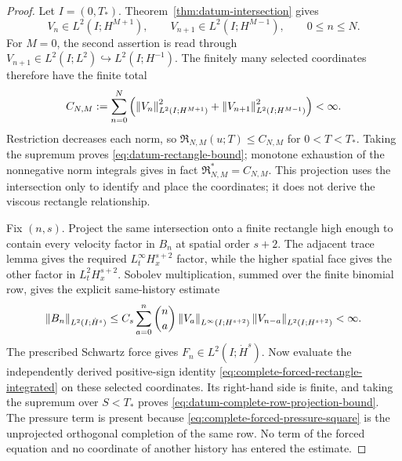 \begin{proof}
Let \(I=(0,T_*)\).  Theorem~\ref{thm:datum-intersection} gives
\[
 V_n\in L^2(I;H^{M+1}),\qquad
 V_{n+1}\in L^2(I;H^{M-1}),
 \qquad 0\le n\le N.
\]
For \(M=0\), the second assertion is read through
\(V_{n+1}\in L^2(I;L^2)\hookrightarrow L^2(I;H^{-1})\).
The finitely many selected coordinates therefore have the finite total
\[
 C_{N,M}:=\sum_{n=0}^N
 \left(\left\lVert V_n\right\rVert_{L^2(I;H^{M+1})}^2
       +\left\lVert V_{n+1}\right\rVert_{L^2(I;H^{M-1})}^2\right)<\infty.
\]
Restriction decreases each norm, so
\(\mathfrak R_{N,M}(u;T)\le C_{N,M}\) for \(0<T<T_*\).
Taking the supremum proves \eqref{eq:datum-rectangle-bound}; monotone
exhaustion of the nonnegative norm integrals gives in fact
\(\mathfrak R_{N,M}^*=C_{N,M}\).  This projection uses the intersection
only to identify and place the coordinates; it does not derive the viscous
rectangle relationship.

Fix \((n,s)\).  Project the same intersection onto a finite rectangle high
enough to contain every velocity factor in \(B_n\) at spatial order \(s+2\).
The adjacent trace lemma gives the required \(L^\infty_tH^{s+2}_x\) factor,
while the higher spatial face gives the other factor in
\(L^2_tH^{s+2}_x\).  Sobolev multiplication, summed over the finite binomial
row, gives the explicit same-history estimate
\begin{equation}
 \left\lVert B_n\right\rVert_{L^2(I;\dot H^s)}
 \le C_s\sum_{a=0}^{n}\binom na
 \left\lVert V_a\right\rVert_{L^\infty(I;H^{s+2})}
 \left\lVert V_{n-a}\right\rVert_{L^2(I;H^{s+2})}
 <\infty.
 \label{eq:datum-complete-binomial-projection-bound}
\end{equation}
The prescribed Schwartz force gives
\(F_n\in L^2(I;\dot H^s)\).  Now evaluate the independently derived
positive-sign identity \eqref{eq:complete-forced-rectangle-integrated} on
these selected coordinates.  Its right-hand side is finite, and taking the
supremum over \(S<T_*\) proves
\eqref{eq:datum-complete-row-projection-bound}.  The pressure term is present
because \eqref{eq:complete-forced-pressure-square} is the unprojected
orthogonal completion of the same row.  No term of the forced equation and no
coordinate of another history has entered the estimate.
\end{proof}

